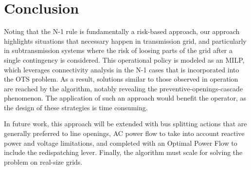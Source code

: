 \section{Conclusion}
Noting that the N-1 rule is fundamentally a risk-based approach, our approach highlights situations that necessary happen in transmission grid, and particularly in subtransmission systems where the risk of loosing parts of the grid after a single contingency is considered. This operational policy is modeled as an MILP, which leverages connectivity analysis in the N-1 cases that is incorporated into the OTS problem. As a result, solutions similar to those observed in operation are reached by the algorithm, notably revealing the preventive-openings-cascade phenomenon. The application of such an approach would benefit the operator, as the design of these strategies is time consuming. 

In future work, this approach will be extended with bus splitting actions that are generally preferred to line openings, AC power flow to take into account reactive power and voltage limitations, and completed with an Optimal Power Flow to include the redispatching lever. Finally, the algorithm must scale for solving the problem on real-size grids.